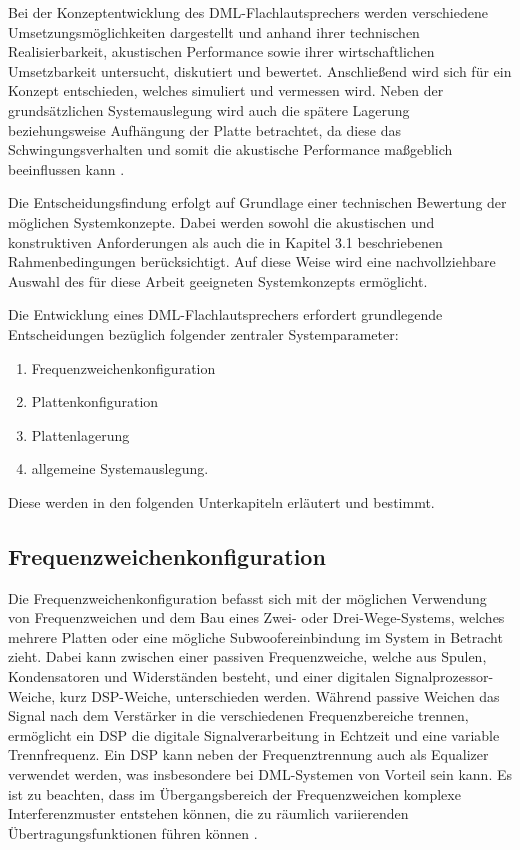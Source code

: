 Bei der Konzeptentwicklung des DML-Flachlautsprechers werden verschiedene Umsetzungsmöglichkeiten dargestellt und anhand ihrer technischen Realisierbarkeit, akustischen Performance sowie ihrer wirtschaftlichen Umsetzbarkeit untersucht, diskutiert und bewertet. Anschließend wird sich für ein Konzept entschieden, welches simuliert und vermessen wird. Neben der grundsätzlichen Systemauslegung wird auch die spätere Lagerung beziehungsweise Aufhängung der Platte betrachtet, da diese das Schwingungsverhalten und somit die akustische Performance maßgeblich beeinflussen kann \cite{Bai2001}.

Die Entscheidungsfindung erfolgt auf Grundlage einer technischen Bewertung der möglichen Systemkonzepte. Dabei werden sowohl die akustischen und konstruktiven Anforderungen als auch die in Kapitel 3.1 beschriebenen Rahmenbedingungen berücksichtigt. Auf diese Weise wird eine nachvollziehbare Auswahl des für diese Arbeit geeigneten Systemkonzepts ermöglicht.

Die Entwicklung eines DML-Flachlautsprechers erfordert grundlegende Entscheidungen bezüglich folgender zentraler Systemparameter:

\begin{enumerate}
    \item Frequenzweichenkonfiguration
    \item Plattenkonfiguration
    \item Plattenlagerung
    \item allgemeine Systemauslegung. 
\end{enumerate}

Diese werden in den folgenden Unterkapiteln erläutert und bestimmt.

\subsection{Frequenzweichenkonfiguration}

Die Frequenzweichenkonfiguration befasst sich mit der möglichen Verwendung von Frequenzweichen und dem Bau eines Zwei- oder Drei-Wege-Systems, welches mehrere Platten oder eine mögliche Subwoofereinbindung im System in Betracht zieht. Dabei kann zwischen einer passiven Frequenzweiche, welche aus Spulen, Kondensatoren und Widerständen besteht, und einer digitalen Signalprozessor-Weiche, kurz DSP-Weiche, unterschieden werden.
Während passive Weichen das Signal nach dem Verstärker in die verschiedenen Frequenzbereiche trennen, ermöglicht ein DSP die digitale Signalverarbeitung in Echtzeit und eine variable Trennfrequenz. Ein DSP kann neben der Frequenztrennung auch als Equalizer verwendet werden, was insbesondere bei DML-Systemen von Vorteil sein kann. 
Es ist zu beachten, dass im Übergangsbereich der Frequenzweichen komplexe Interferenzmuster entstehen können, die zu räumlich variierenden Übertragungsfunktionen führen können \cite{Moeser2005}.

